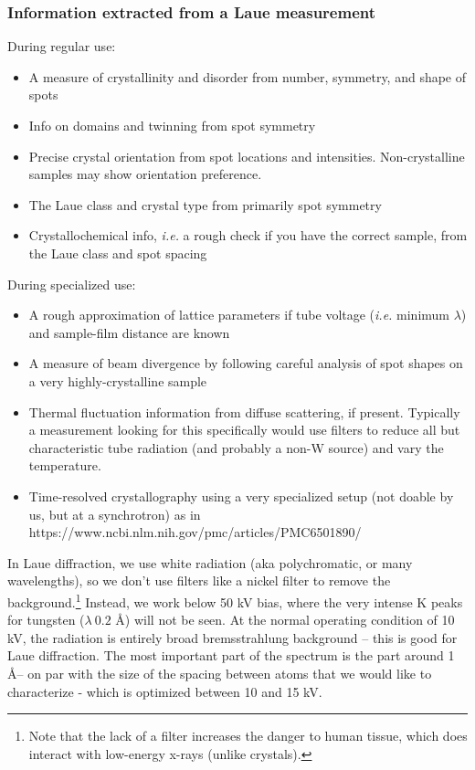 \subsubsection{Information extracted from a Laue measurement}
\begin{singlespace}
During regular use:
\begin{itemize}
    \item A measure of crystallinity and disorder from number, symmetry, and shape of spots
    \item Info on domains and twinning from spot symmetry
    \item Precise crystal orientation from spot locations and intensities. Non-crystalline samples may show orientation preference.
    \item The Laue class and crystal type from primarily spot symmetry 
    \item Crystallochemical info, \textit{i.e.} a rough check if you have the correct sample, from the Laue class and spot spacing
\end{itemize}
\end{singlespace}
During specialized use:
\begin{itemize}
    \item A rough approximation of lattice parameters if tube voltage (\textit{i.e.} minimum $\lambda$) and sample-film distance are known
    \item A measure of beam divergence by following careful analysis of spot shapes on a very highly-crystalline sample 
    \item Thermal fluctuation information from diffuse scattering, if present. Typically a measurement looking for this specifically would use filters to reduce all but characteristic tube radiation (and probably a non-W source) and vary the temperature.
    \item Time-resolved crystallography using a very specialized setup (not doable by us, but at a synchrotron) as in https://www.ncbi.nlm.nih.gov/pmc/articles/PMC6501890/ 
\end{itemize}
In Laue diffraction, we use white radiation (aka polychromatic, or many wavelengths), so we don’t use filters like a nickel filter to remove the background.\footnote{Note that the lack of a filter increases the danger to human tissue, which does interact with low-energy x-rays (unlike crystals).} Instead, we work below 50 kV bias, where the very intense K peaks for tungsten ($\lambda~0.2 $ \AA) will not be seen. At the normal operating condition of 10 kV, the radiation is entirely broad bremsstrahlung background – this is good for Laue diffraction. The most important part of the spectrum is the part around 1 \AA – on par with the size of the spacing between atoms that we would like to characterize - which is optimized between 10 and 15 kV.
